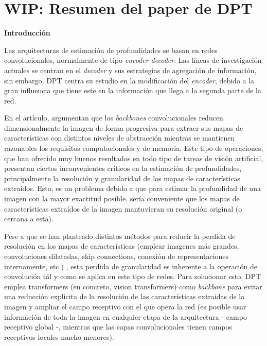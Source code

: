 \documentclass[a4paper]{article}
\begin{document}
\section{WIP: Resumen del paper de DPT}

\textbf{Introducción}

Las arquitecturas de estimación de profundidades se basan en redes convolucionales, normalmente de tipo \textit{encoder-decoder}. Las líneas de investigación actuales se centran en el \textit{decoder} y sus estrategias de agregación de información, sin embargo, DPT centra su estudio en la modificación del \textit{encoder}, debido a la gran influencia que tiene este en la información que llega a la segunda parte de la red.

En el artículo, argumentan que los \textit{backbones} convolucionales reducen dimensionalmente la imagen de forma progresiva para extraer sus mapas de características con distintos niveles de abstracción mientras se mantienen razonables los requisitos computacionales y de memoria. Este tipo de operaciones, que han ofrecido muy buenos resultados en todo tipo de tareas de visión artificial, presentan ciertos inconvenientes críticos en la estimación de profundidades, principalmente la resolución y granularidad de los mapas de características extraídos. Esto, es un problema debido a que para estimar la profundidad de una imagen con la mayor exactitud posible, sería conveniente que los mapas de características extraídos de la imagen mantuvieran su resolución original (o cercana a esta).

Pese a que se han planteado distintos métodos para reducir la perdida de resolución en los mapas de características (emplear imagenes más grandes, convoluciones dilatadas, skip connections, conexión de representaciones internamente, etc.) , esta perdida de granularidad es inherente a la operación de convolución tál y como se aplica en este tipo de redes. Para solucionar esto, DPT emplea transformers (en concreto, vision transformers) como \textit{backbone} para evitar una reducción explicita de la resolución de las características extraidas de la imagen y ampliar el campo receptivo con el que opera la red (es posible usar información de toda la imagen en cualquier etapa de la arquitectura - campo receptivo global -, mientras que las capas convolucionales tienen campos receptivos locales mucho menores).
\end{document}
